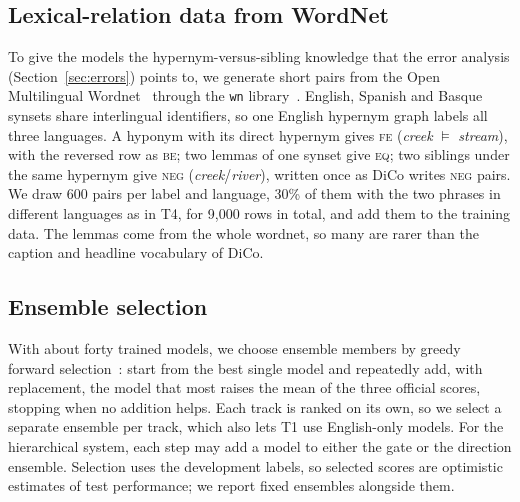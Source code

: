 \documentclass[conference]{IEEEtran}
\newcommand{\EQ}{\textsc{eq}}
\newcommand{\FE}{\textsc{fe}}
\newcommand{\BE}{\textsc{be}}
\newcommand{\NEG}{\textsc{neg}}
\begin{document}
\subsection{Lexical-relation data from WordNet}
\label{sec:wordnet}
To give the models the hypernym-versus-sibling knowledge that the error
analysis (Section~\ref{sec:errors}) points to, we generate short pairs from the
Open Multilingual Wordnet~\cite{bond2013omw} through the \texttt{wn}
library~\cite{goodman2021wn}. English, Spanish and Basque synsets share
interlingual identifiers, so one English hypernym graph labels all three
languages. A hyponym with its direct hypernym gives \FE{} (\emph{creek}
$\models$ \emph{stream}), with the reversed row as \BE; two lemmas of one
synset give \EQ; two siblings under the same hypernym give \NEG{}
(\emph{creek}/\emph{river}), written once as DiCo writes \NEG{} pairs. We draw
600 pairs per label and language, 30\% of them with the two phrases in
different languages as in T4, for 9{,}000 rows in total, and add them to the
training data. The lemmas come from the whole wordnet, so many are rarer than
the caption and headline vocabulary of DiCo.

\subsection{Ensemble selection}
\label{sec:selection}
With about forty trained models, we choose ensemble members by greedy forward
selection~\cite{caruana2004ensemble}: start from the best single model and
repeatedly add, with replacement, the model that most raises the mean of the
three official scores, stopping when no addition helps. Each track is ranked on
its own, so we select a separate ensemble per track, which also lets T1 use
English-only models. For the hierarchical system, each step may add a model to
either the gate or the direction ensemble. Selection uses the development
labels, so selected scores are optimistic estimates of test performance; we
report fixed ensembles alongside them.
\end{document}
